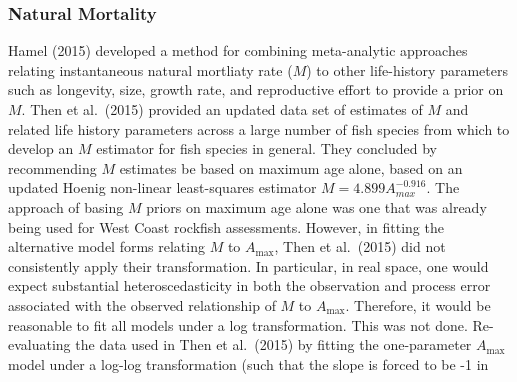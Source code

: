 \documentclass[11pt,
  english,
  a4paper,
]{article}
\begin{document}

\hypertarget{natural-mortality}{%
\subsubsection{Natural Mortality}\label{natural-mortality}}

\leavevmode\tagmcend\tagstructend


Hamel {(2015)\leavevmode\tagmcend\tagstructend} developed a method for combining meta-analytic approaches relating instantaneous natural mortliaty rate ({\(M\)\leavevmode\tagmcend\tagstructend}) to other life-history parameters such as longevity, size, growth rate, and reproductive effort to provide a prior on {\(M\)\leavevmode\tagmcend\tagstructend}. Then et al.~{(2015)\leavevmode\tagmcend\tagstructend} provided an updated data set of estimates of {\(M\)\leavevmode\tagmcend\tagstructend} and related life history parameters across a large number of fish species from which to develop an {\(M\)\leavevmode\tagmcend\tagstructend} estimator for fish species in general. They concluded by recommending {\(M\)\leavevmode\tagmcend\tagstructend} estimates be based on maximum age alone, based on an updated Hoenig non-linear least-squares estimator {\(M=4.899A^{-0.916}_{max}\)\leavevmode\tagmcend\tagstructend}. The approach of basing {\(M\)\leavevmode\tagmcend\tagstructend} priors on maximum age alone was one that was already being used for West Coast rockfish assessments. However, in fitting the alternative model forms relating {\(M\)\leavevmode\tagmcend\tagstructend} to {\(A_{\text{max}}\)\leavevmode\tagmcend\tagstructend}, Then et al.~{(2015)\leavevmode\tagmcend\tagstructend} did not consistently apply their transformation. In particular, in real space, one would expect substantial heteroscedasticity in both the observation and process error associated with the observed relationship of {\(M\)\leavevmode\tagmcend\tagstructend} to {\(A_{\text{max}}\)\leavevmode\tagmcend\tagstructend}. Therefore, it would be reasonable to fit all models under a log transformation. This was not done. Re-evaluating the data used in Then et al.~{(2015)\leavevmode\tagmcend\tagstructend} by fitting the one-parameter {\(A_{\text{max}}\)\leavevmode\tagmcend\tagstructend} model under a log-log transformation (such that the slope is forced to be -1 in 
\end{document}
